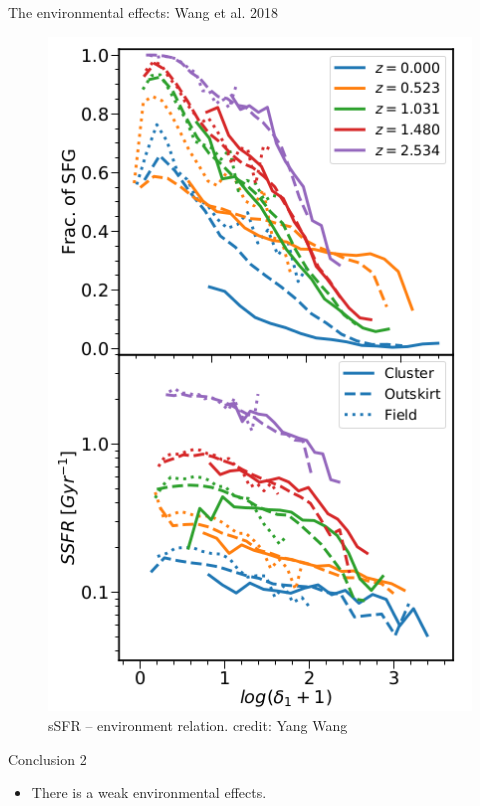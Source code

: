 \documentclass[aspectratio=43]{beamer}
\begin{document}
\begin{frame}{The environmental effects: Wang et al. 2018}
{\begin{figure}
    \includegraphics[width=0.4\linewidth]{Yang-SFR}
    \vspace{-0.6cm}
    \caption{sSFR -- environment relation. credit: Yang Wang}
  \end{figure}
  }
\end{frame}
\begin{frame}{Conclusion 2}
  {
  \begin{itemize}
    \item There is a weak environmental effects.
  \end{itemize}}
\end{frame}
\end{document}
